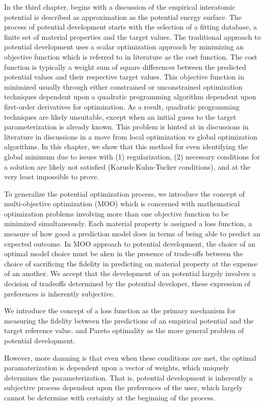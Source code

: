 In the third chapter, begins with a discussion of the empirical interatomic potential is described as approximation as the potential energy surface.
The process of potential development starts with the selection of a fitting database, a finite set of material properties and the target values.
The traditional approach to potential development uses a scalar optimization approach by minimizing an objective function which is referred to in literature as the cost function.
The cost function is typically a weight sum of square differences between the predicted potential values and their respective target values.
This objective function in minimized usually through either constrained or unconstrained optimization techniques dependent upon a quadratic programming algorithm dependent upon first-order derivatives for optimization.  
As a result, quadratic programming techniques are likely unsuitable, except when an initial guess to the target parameterization is already known.
This problem is hinted at in discussions in literature in discussions in a move from local optimization vs global optimization algorithms.
In this chapter, we show that this method for even identifying the global minimum due to issues with (1) regularization, (2) necessary conditions for a solution are likely not satisfied (Karush-Kuhn-Tucker conditions), and at the very least impossible to prove.

To generalize the potential optimization process, we introduce the concept of multi-objective optimization (MOO) which is concerned with mathematical optimization problems involving more than one objective function to be minimized simultaneously.  Each material property is assigned a loss function, a measure of how good a prediction model does in terms of being able to predict an expected outcome.
In MOO approach to potential development, the choice of an optimal model choice must be aken in the presence of trade-offs between the choice of sacrificing the fidelity in predicting on material property at the expense of an another.
We accept that the development of an potential largely involves a decision of tradeoffs determined by the potential developer, these expression of preferences is inherently subjective.


We introduce the concept of a loss function as the primary mechanism for measuring the fidelity between the predictions of an empirical potential and the target reference value.
 and Pareto optimality as the more general problem of potential development.

However, more damning is that even when these conditions are met, the optimal paramaterization is dependent upon a vector of weights, which uniquely determines the parameterization.
That is, potential development is inherently a subjective process dependent upon the preferences of the user, which largely cannot be determine with certainty at the beginning of the process.

